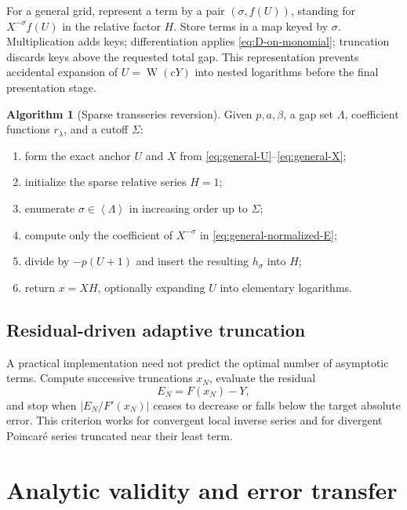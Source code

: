 \documentclass[11pt,oneside]{article}
\theoremstyle{plain}
\theoremstyle{definition}
\newtheorem{algorithm}[theorem]{Algorithm}
\theoremstyle{remark}
\newcommand{\W}{\operatorname{W}}
\newcommand{\angles}[1]{\left\langle #1\right\rangle}
\begin{document}
For a general grid, represent a term by a pair
\((\sigma,f(U))\), standing for \(X^{-\sigma}f(U)\) in the relative factor
\(H\).  Store terms in a map keyed by \(\sigma\).  Multiplication adds keys;
differentiation applies \eqref{eq:D-on-monomial}; truncation discards keys above
the requested total gap.  This representation prevents accidental expansion
of \(U=\W(cY)\) into nested logarithms before the final presentation stage.

\begin{algorithm}[Sparse transseries reversion]
\label{alg:sparse-reversion}
Given \(p,a,\beta\), a gap set \(\Lambda\), coefficient functions
\(r_\lambda\), and a cutoff \(\Sigma\):
\begin{enumerate}
\item form the exact anchor \(U\) and \(X\) from
      \eqref{eq:general-U}--\eqref{eq:general-X};
\item initialize the sparse relative series \(H=1\);
\item enumerate \(\sigma\in\angles{\Lambda}\) in increasing order up to
      \(\Sigma\);
\item compute only the coefficient of \(X^{-\sigma}\) in
      \eqref{eq:general-normalized-E};
\item divide by \(-p(U+1)\) and insert the resulting \(h_\sigma\) into \(H\);
\item return \(x=XH\), optionally expanding \(U\) into elementary logarithms.
\end{enumerate}
\end{algorithm}

\subsection{Residual-driven adaptive truncation}

A practical implementation need not predict the optimal number of asymptotic
terms.  Compute successive truncations \(x_N\), evaluate the residual
\begin{equation}
 E_N=F(x_N)-Y,
 \label{eq:residual-def}
\end{equation}
and stop when \(|E_N/F'(x_N)|\) ceases to decrease or falls below the target
absolute error.  This criterion works for convergent local inverse series and
for divergent Poincar\'e series truncated near their least term.

\section{Analytic validity and error transfer}
\label{sec:analytic-validity}
\end{document}
